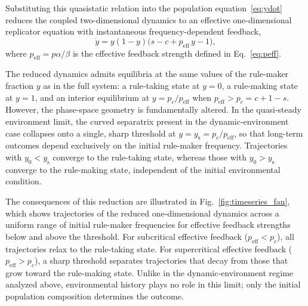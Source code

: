 Substituting this quasistatic relation into the population equation~\eqref{eq:ydot}
reduces the coupled two-dimensional dynamics to an effective one-dimensional replicator
equation with instantaneous frequency-dependent feedback,
\[
\dot y = y(1-y)\bigl(s - c + p_{\mathrm{eff}}\,y - 1\bigr),
\]
where $p_{\mathrm{eff}} = p\alpha/\beta$ is the effective feedback strength defined in
Eq.~\eqref{eq:peff}.

The reduced dynamics admits equilibria at the same values of the rule-maker fraction $y$
as in the full system: a rule-taking state at $y=0$, a rule-making state at $y=1$, and an
interior equilibrium at $y = p_c/p_{\mathrm{eff}}$ when $p_{\mathrm{eff}} > p_c = c + 1 - s$.
However, the phase-space geometry is fundamentally altered. In the quasi-steady environment limit,
the curved separatrix present in the dynamic-environment case collapses onto a single,
sharp threshold at $y = y_{\mathrm{s}} = p_c/p_{\mathrm{eff}}$, so that long-term outcomes
depend exclusively on the initial rule-maker frequency. Trajectories with $y_0 <
y_{\mathrm{s}}$ converge to the rule-taking state, whereas those with $y_0 >
y_{\mathrm{s}}$ converge to the rule-making state, independent of the initial
environmental condition.

The consequences of this reduction are illustrated in
Fig.~\ref{fig:timeseries_fan}, which shows trajectories of the reduced one-dimensional
dynamics across a uniform range of initial rule-maker frequencies for effective feedback strengths
below and above the threshold. For subcritical effective feedback ($p_{\mathrm{eff}} < p_c$), all trajectories
relax to the rule-taking state. For supercritical effective feedback ($p_{\mathrm{eff}} > p_c$), a sharp threshold
separates trajectories that decay from those that grow toward the rule-making state.
Unlike in the dynamic-environment regime analyzed above, environmental history plays no
role in this limit; only the initial population composition determines the outcome.


